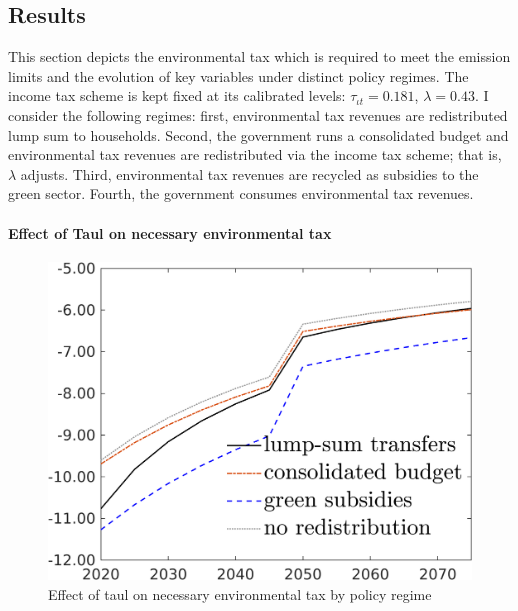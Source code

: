 \subsection{Results }
This section depicts the environmental tax which is required to meet the emission limits and the evolution of key variables under distinct policy regimes. The income tax scheme is kept fixed at its calibrated levels: $\tau_{\iota t}=0.181$, $\lambda=0.43$.
I consider the following regimes: first, environmental tax revenues are redistributed lump sum to households. Second, the government runs a consolidated budget and environmental tax revenues are redistributed via the income tax scheme; that is, $\lambda$ adjusts. Third, environmental tax revenues are recycled as subsidies to the green sector. Fourth, the government consumes environmental tax revenues. 


\paragraph{Effect of Taul on necessary environmental tax}


\begin{figure}[h!!]
	\centering
	\caption{Effect of taul on necessary environmental tax by policy regime }\label{fig:CompTaul_TAUF}
	
	\begin{minipage}[]{0.32\textwidth}
		\includegraphics[width=1\textwidth]{../../codding_model/own_basedOnFried/optimalPol_010922_revision/figures/all_5Sept22/TAUFCO2_PerDifTAUL_spillover0_nsk0_xgr0_sep1_LFlimit1_emsbase0_countec0_GovRev1_etaa0.79_lgd1.png}
	\end{minipage}
\end{figure}


